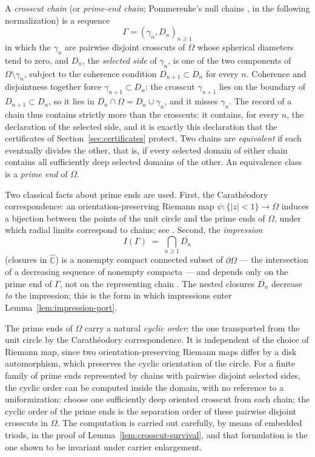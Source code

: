 \documentclass[11pt,reqno]{amsart}
\theoremstyle{definition}
\theoremstyle{remark}
\newcommand{\Chat}{\widehat{\mathbb C}}
\begin{document}
A \emph{crosscut chain} (or \emph{prime-end chain}; Pommerenke's null
chains \cite{Pom92}, in the following normalization) is a sequence
\[
\Gamma=(\gamma_n,D_n)_{n\ge1}
\]
in which the $\gamma_n$ are pairwise disjoint crosscuts of $\Omega$ whose
spherical diameters tend to zero, and $D_n$, the \emph{selected side} of
$\gamma_n$, is one of the two components of $\Omega\setminus\gamma_n$,
subject to the coherence condition $D_{n+1}\subset D_n$ for every $n$.
Coherence and disjointness together force $\gamma_{n+1}\subset D_n$:
the crosscut $\gamma_{n+1}$ lies on the boundary of
$D_{n+1}\subset D_n$, so it lies in
$\overline{D_n}\cap\Omega=D_n\cup\gamma_n$, and it misses $\gamma_n$.
The record of a chain thus contains strictly more than the crosscuts: it
contains, for every $n$, the declaration of the selected side, and it is
exactly this declaration that the certificates of
Section~\ref{sec:certificates} protect.  Two chains are
\emph{equivalent} if each eventually divides the other, that is, if every
selected domain of either chain contains all sufficiently deep selected
domains of the other.  An equivalence class is a \emph{prime end} of
$\Omega$.

Two classical facts about prime ends are used.  First, the
Carath\'eodory correspondence: an orientation-preserving Riemann map
$\psi\colon\{|z|<1\}\to\Omega$ induces a bijection between the points of
the unit circle and the prime ends of $\Omega$, under which radial limits
correspond to chains; see \cite[Chapter~2]{Pom92}.  Second, the
\emph{impression}
\[
I(\Gamma)\;=\;\bigcap_{n\ge1}\overline{D_n}
\]
(closures in $\Chat$) is a nonempty compact connected subset of
$\partial\Omega$ --- the intersection of a decreasing sequence of
nonempty compacta --- and depends only on the prime end of $\Gamma$, not
on the representing chain \cite{Pom92}.  The nested closures
$\overline{D_n}$ decrease \emph{to} the impression; this is the form in
which impressions enter Lemma~\ref{lem:impression-port}.

The prime ends of $\Omega$ carry a natural \emph{cyclic order}: the one
transported from the unit circle by the Carath\'eodory correspondence.
It is independent of the choice of Riemann map, since two
orientation-preserving Riemann maps differ by a disk automorphism, which
preserves the cyclic orientation of the circle.  For a finite family of
prime ends represented by chains with pairwise disjoint selected sides,
the cyclic order can be computed inside the domain, with no reference to
a uniformization: choose one sufficiently deep oriented crosscut from
each chain; the cyclic order of the prime ends is the separation order of
these pairwise disjoint crosscuts in $\Omega$.  The computation is
carried out carefully, by means of embedded triods, in the proof of
Lemma~\ref{lem:crosscut-survival}, and that formulation is the one shown
to be invariant under carrier enlargement.
\end{document}
